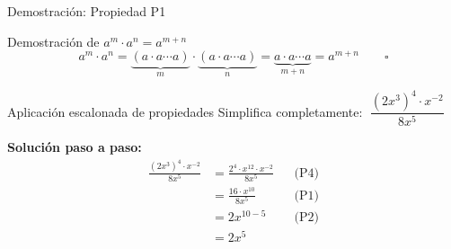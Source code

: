 \documentclass[12pt, aspectratio=169]{beamer}
\begin{document}
\begin{frame}{Demostración: Propiedad P1}
  \begin{block}{Demostración de $a^m \cdot a^n = a^{m+n}$}
    \[
      a^m \cdot a^n
      = \underbrace{(a \cdot a \cdots a)}_{m}\cdot \underbrace{(a \cdot a \cdots a)}_{n}
      = \underbrace{a \cdot a \cdots a}_{m+n}
      = a^{m+n} \qquad \square
    \]
  \end{block}

  \vspace{8pt}

  \begin{ejercicio}{Aplicación escalonada de propiedades}
    Simplifica completamente: $\;\dfrac{\left(2x^3\right)^4 \cdot x^{-2}}{8x^5}$

    \medskip
    \textbf{Solución paso a paso:}
    \begin{align*}
      \frac{\left(2x^3\right)^4 \cdot x^{-2}}{8x^5}
      &= \frac{2^4 \cdot x^{12} \cdot x^{-2}}{8x^5}
        && \text{(P4)} \\[4pt]
      &= \frac{16 \cdot x^{10}}{8x^5}
        && \text{(P1)} \\[4pt]
      &= 2x^{10-5}
        && \text{(P2)} \\[4pt]
      &= \boxed{2x^5}
    \end{align*}
  \end{ejercicio}
\end{frame}
\end{document}
